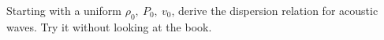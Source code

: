 
 \label{sound_problem}   Starting with a uniform $\rho_0,\ P_0,\ v_0$, derive the
    dispersion relation for acoustic waves.  Try it without looking at the book.

